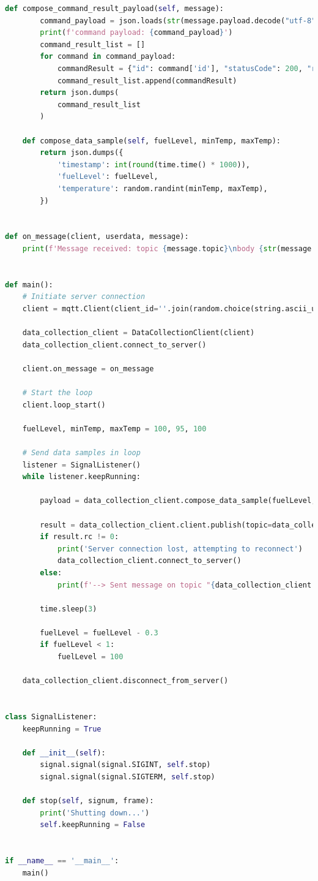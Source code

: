 {\begin{lstlisting}[language=Python]
    def compose_command_result_payload(self, message):
        command_payload = json.loads(str(message.payload.decode("utf-8")))
        print(f'command payload: {command_payload}')
        command_result_list = []
        for command in command_payload:
            commandResult = {"id": command['id'], "statusCode": 200, "reasonPhrase": "OK", "payload": "Success"}
            command_result_list.append(commandResult)
        return json.dumps(
            command_result_list
        )

    def compose_data_sample(self, fuelLevel, minTemp, maxTemp):
        return json.dumps({
            'timestamp': int(round(time.time() * 1000)),
            'fuelLevel': fuelLevel,
            'temperature': random.randint(minTemp, maxTemp),
        })


def on_message(client, userdata, message):
    print(f'Message received: topic {message.topic}\nbody {str(message.payload.decode("utf-8"))}')


def main():
    # Initiate server connection
    client = mqtt.Client(client_id=''.join(random.choice(string.ascii_uppercase + string.digits) for _ in range(6)))

    data_collection_client = DataCollectionClient(client)
    data_collection_client.connect_to_server()

    client.on_message = on_message

    # Start the loop
    client.loop_start()

    fuelLevel, minTemp, maxTemp = 100, 95, 100

    # Send data samples in loop
    listener = SignalListener()
    while listener.keepRunning:

        payload = data_collection_client.compose_data_sample(fuelLevel, minTemp, maxTemp)

        result = data_collection_client.client.publish(topic=data_collection_client.data_collection_topic, payload=payload)
        if result.rc != 0:
            print('Server connection lost, attempting to reconnect')
            data_collection_client.connect_to_server()
        else:
            print(f'--> Sent message on topic "{data_collection_client.data_collection_topic}":\n{payload}')

        time.sleep(3)

        fuelLevel = fuelLevel - 0.3
        if fuelLevel < 1:
            fuelLevel = 100

    data_collection_client.disconnect_from_server()


class SignalListener:
    keepRunning = True

    def __init__(self):
        signal.signal(signal.SIGINT, self.stop)
        signal.signal(signal.SIGTERM, self.stop)

    def stop(self, signum, frame):
        print('Shutting down...')
        self.keepRunning = False


if __name__ == '__main__':
    main()
\end{lstlisting}

}
